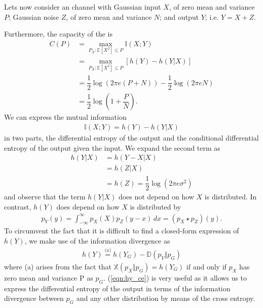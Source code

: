 Lets now consider an  channel with Gaussian input $X$, of zero mean and variance $P$; Gaussian noise $Z$, of zero mean and variance $N$; and output $Y$; i.e. $Y = X + Z$. %

Furthermore, the capacity of the  is
\begin{align}
\label{eqn:awgn_cap}
	C(P) &= \max\limits_{P_X:\mathbb{E}[X^2] \leq P} \mathbb{I}(X;Y)\\
	& = \max\limits_{P_X:\mathbb{E}[X^2] \leq P}[h(Y) - h(Y \vert X)]\\
	& = \dfrac{1}{2} \log (2 \pi e (P+N)) - \dfrac{1}{2} \log (2 \pi e N)\\
	& = \dfrac{1}{2} \log \left(1 + \dfrac{P}{N} \right). 
\end{align}
We can express the mutual information
\begin{align}
\label{eqn:MI}
	\mathbb{I}(X;Y) = h(Y) - h(Y \vert X)
\end{align}
in two parts, the differential entropy of the output and the conditional differential entropy of the output given the input.
We expand the second term as
\begin{align}
	h(Y \vert X) &= h(Y - X \vert X) \\
	& = h(Z \vert X)\\
	& = h(Z) = \dfrac{1}{2} \log \left(2 \pi e \sigma^2 \right)
\end{align}
and observe that the term $h(Y \vert X)$ does not depend on how $X$ is distributed. In contrast, $h(Y)$ does depend on how $X$ is distributed by
\begin{align}
	p_Y(y) = \int_{-\infty}^{\infty} p_X(X)p_Z(y -x) \,dx = (p_X \star p_Z)(y).
\end{align}
To circumvent the fact that it is difficult to find a closed-form expression of $h(Y)$, we make use of the information divergence as
\begin{align}
\label{eqn:hy_ce}
	h(Y) \overset{\text{(a)}}{=}  h(Y_G) - \mathbb{D}(p_Y \Vert p_G)
\end{align}
where (a) arises from the fact that $\mathbb{X}(p_X \Vert p_G) = h(Y_G)$ if and only if $p_X$ has zero mean and variance P as $p_G$. (\ref{eqn:hy_ce}) is very useful as it allows us to express the differential entropy of the output in terms of the information divergence between $p_G$ and any other distribution by means of the cross entropy. 

